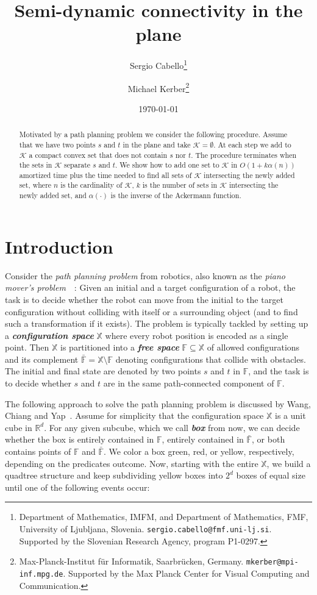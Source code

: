 \documentclass[a4paper,11pt]{article}
\title{Semi-dynamic connectivity in the plane}
\author{
	Sergio Cabello\thanks{Department of Mathematics, IMFM, and
			Department of Mathematics, FMF, University of Ljubljana, Slovenia.
			\texttt{sergio.cabello@fmf.uni-lj.si}.
        	Supported by the Slovenian Research Agency, program P1-0297.}
\and
	Michael Kerber\thanks{Max-Planck-Institut f\"ur Informatik, Saarbr\"ucken, Germany.
                              \texttt{mkerber@mpi-inf.mpg.de}.
                              Supported by the Max Planck Center for Visual Computing and Communication.}
}
\date{\today}
\newcommand{\RR}{\mathbb{R}}
\newcommand{\calK}{\mathcal{K}}
\newcommand{\freespace}{\mathbb{F}}
\newcommand{\configspace}{\mathbb{X}}
\def\DEF#1{\textbf{\emph{#1}}}
\begin{document}
\maketitle

\begin{abstract}
	Motivated by a path planning problem we consider the following procedure.
	Assume that we have two points $s$ and $t$ in the plane and take $\calK=\emptyset$.
	At each step we add to $\calK$ a compact convex set that does not
	contain $s$ nor $t$.
	The procedure terminates when the sets in $\calK$ separate $s$ and $t$.
	We show how to add one set to $\calK$
	in $O(1+k\alpha(n))$ amortized time plus the time needed 
	to find all sets of $\calK$ intersecting the newly added set,
	where $n$ is the cardinality of $\calK$,
	$k$ is the number of sets in $\calK$ intersecting the newly added set, and 
	$\alpha(\cdot)$ is the inverse of the Ackermann function.
\end{abstract}


\section{Introduction}

Consider the \emph{path planning problem} from robotics, 
also known as the \emph{piano mover's problem}~\cite{lavalle}~\cite[Ch.13]{dutchbook}:
Given an initial and a target configuration of a robot, the task
is to decide whether the robot can move from the initial to the target
configuration without colliding with itself or a surrounding object
(and to find such a transformation if it exists).
The problem is typically tackled by setting up a \DEF{configuration space} $\configspace$
where every robot position is encoded as a single point.
Then $\configspace$ is partitioned into a \DEF{free space} $\freespace\subseteq\configspace$ 
of allowed configurations and its complement 
$\bar{\freespace}= \configspace\setminus\freespace$ denoting configurations
that collide with obstacles. The initial and final state are denoted by two points $s$
and $t$ in $\freespace$, and the task is to decide whether $s$ and $t$ are in the same
path-connected component of $\freespace$.

The following approach to solve the path planning problem
is discussed by Wang, Chiang and Yap~\cite{wcy-soft}. 
Assume for simplicity
that the configuration space $\configspace$ is a unit cube in $\RR^d$.
For any given subcube, which we call \DEF{box} from now, we can decide whether the box 
is entirely contained in $\freespace$, entirely contained in $\bar{\freespace}$,
or both contains points of $\freespace$ and $\bar{\freespace}$. We color a box
green, red, or yellow, respectively, depending on the predicates outcome.
Now, starting with the entire $\configspace$, we build a quadtree structure
and keep subdividing yellow boxes
into $2^d$ boxes of equal size until one of the following events occur:
\end{document}
